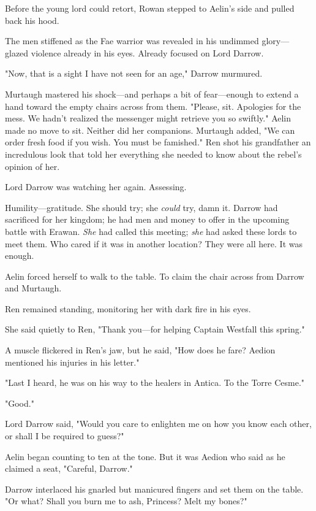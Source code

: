 Before the young lord could retort, Rowan stepped to Aelin's side and pulled back his hood.

The men stiffened as the Fae warrior was revealed in his undimmed glory--- glazed violence already in his eyes. 
Already focused on Lord Darrow.

"Now, that is a sight I have not seen for an age," Darrow murmured.

Murtaugh mastered his shock---and perhaps a bit of fear---enough to extend a hand toward the empty chairs across from them. 
"Please, sit. 
Apologies for the mess. 
We hadn't realized the messenger might retrieve you so swiftly." 
Aelin made no move to sit. 
Neither did her companions. 
Murtaugh added, "We can order fresh food if you wish. 
You must be famished." 
Ren shot his grandfather an incredulous look that told her everything she needed to know about the rebel's opinion of her.

Lord Darrow was watching her again.
Assessing.

Humility---gratitude. 
She should try; she \emph{could} try, damn it. 
Darrow had sacrificed for her kingdom; he had men and money to offer in the upcoming battle with Erawan. 
\emph{She} had called this meeting; \emph{she} had asked these lords to meet them. 
Who cared if it was in another location? 
They were all here. 
It was enough.

Aelin forced herself to walk to the table. 
To claim the chair across from Darrow and Murtaugh.

Ren remained standing, monitoring her with dark fire in his eyes.

She said quietly to Ren, "Thank you---for helping Captain Westfall this spring."

A muscle flickered in Ren's jaw, but he said, "How does he fare?
Aedion mentioned his injuries in his letter."

"Last I heard, he was on his way to the healers in Antica. 
To the Torre Cesme."

"Good."

Lord Darrow said, "Would you care to enlighten me on how you know each other, or shall I be required to guess?"

Aelin began counting to ten at the tone. 
But it was Aedion who said as he claimed a seat, "Careful, Darrow."

Darrow interlaced his gnarled but manicured fingers and set them on the table. 
"Or what?
Shall you burn me to ash, Princess? 
Melt my bones?"

